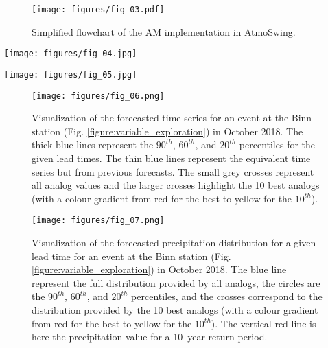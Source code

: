 \documentclass[gmdd]{copernicus}
\begin{document}
\begin{figure}[t]
	\texttt{[image: figures/fig\_03.pdf]}
	\caption{Simplified flowchart of the AM implementation in AtmoSwing.}
	\label{figure:flowchart_modules_atmoswing}
\end{figure}

\begin{figure*}[t]
	\texttt{[image: figures/fig\_04.jpg]}
	\caption{Graphical user interface of the Viewer module (Elevation data from The Shuttle Radar Topography Mission - SRTM, and hydrological network from SwissTopo). The values on the map represent the $90^{th}$ percentile (as selected on the left panel) of the precipitation values from the analog samples at the different stations and for the selected lead time. The colour is proportional to the selected return period (10~years here).}
	\label{figure:atmoswing-viewer-gui}
\end{figure*}

\begin{figure*}[t]
	\texttt{[image: figures/fig\_05.jpg]}
	\caption{Same as Fig. \ref{figure:atmoswing-viewer-gui} but for multiple lead times.}
	\label{figure:atmoswing-viewer-snail}
\end{figure*}

\begin{figure}[t]
	\texttt{[image: figures/fig\_06.png]}
	\caption{Visualization of the forecasted time series for an event at the Binn station (Fig. \ref{figure:variable_exploration}) in October 2018. The thick blue lines represent the $90^{th}$, $60^{th}$, and $20^{th}$ percentiles for the given lead times. The thin blue lines represent the equivalent time series but from previous forecasts. The small grey crosses represent all analog values and the larger crosses highlight the 10 best analogs (with a colour gradient from red for the best to yellow for the $10^{th}$).}
	\label{figure:atmoswing-viewer-timeseries}
\end{figure}

\begin{figure}[t]
	\texttt{[image: figures/fig\_07.png]}
	\caption{Visualization of the forecasted precipitation distribution for a given lead time for an event at the Binn station (Fig. \ref{figure:variable_exploration}) in October 2018. The blue line represent the full distribution provided by all analogs, the circles are the $90^{th}$, $60^{th}$, and $20^{th}$ percentiles, and the crosses correspond to the distribution provided by the 10 best analogs (with a colour gradient from red for the best to yellow for the $10^{th}$). The vertical red line is here the precipitation value for a 10~year return period.}
	\label{figure:atmoswing-viewer-distribution}
\end{figure}
\end{document}
